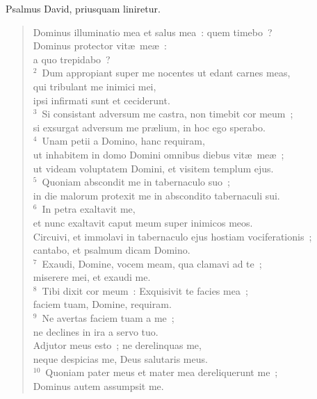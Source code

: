 \lettrine[lines=3,image=true,loversize=0.05,lraise=-0.03]{P}{}salmus David, priusquam liniretur. \begin{flushleft}\begin{verse}\vspace{6pt}Dominus illuminatio mea et salus mea~: quem timebo~?\\ Dominus protector vit\ae\ me\ae~:\\ a quo trepidabo~?\\
${}^{2}$~Dum appropiant super me nocentes ut edant carnes meas,\\ qui tribulant me inimici mei,\\ ipsi infirmati sunt et ceciderunt.\\
${}^{3}$~Si consistant adversum me castra, non timebit cor meum~;\\ si exsurgat adversum me pr\ae lium, in hoc ego sperabo.\\
${}^{4}$~Unam petii a Domino, hanc requiram,\\ ut inhabitem in domo Domini omnibus diebus vit\ae\ me\ae~;\\ ut videam voluptatem Domini, et visitem templum ejus.\\
${}^{5}$~Quoniam abscondit me in tabernaculo suo~;\\ in die malorum protexit me in abscondito tabernaculi sui.\\
${}^{6}$~In petra exaltavit me,\\ et nunc exaltavit caput meum super inimicos meos.\\ Circuivi, et immolavi in tabernaculo ejus hostiam vociferationis~;\\ cantabo, et psalmum dicam Domino.\\
${}^{7}$~Exaudi, Domine, vocem meam, qua clamavi ad te~;\\ miserere mei, et exaudi me.\\
${}^{8}$~Tibi dixit cor meum~: Exquisivit te facies mea~;\\ faciem tuam, Domine, requiram.\\
${}^{9}$~Ne avertas faciem tuam a me~;\\ ne declines in ira a servo tuo.\\ Adjutor meus esto~; ne derelinquas me,\\ neque despicias me, Deus salutaris meus.\\
${}^{10}$~Quoniam pater meus et mater mea dereliquerunt me~;\\ Dominus autem assumpsit me.\\

\end{verse}
\end{flushleft}
